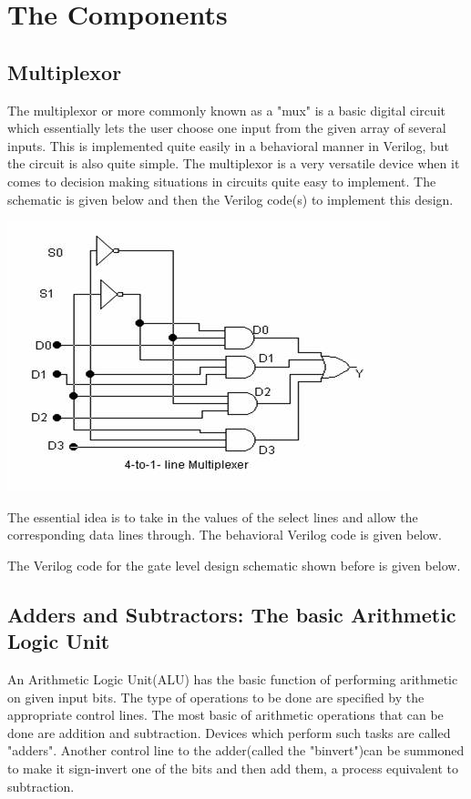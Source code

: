 \documentclass[11pt]{article}
\begin{document}
\section{The Components}
\subsection{Multiplexor}
The multiplexor or more commonly known as a "mux" is a basic digital circuit which essentially lets the user choose one input from the given array of several inputs. This is implemented quite easily in a behavioral manner in Verilog, but the circuit is also quite simple. The multiplexor is a very versatile device when it comes to decision making situations in circuits quite easy to implement. The schematic is given below and then the Verilog code(s) to implement this design.

\includegraphics[scale=1.15]{image010.jpg}

The essential idea is to take in the values of the select lines and allow the corresponding data lines through. The behavioral Verilog code is given below.

The Verilog code for the gate level design schematic shown before is given below.


\subsection{Adders and Subtractors: The basic Arithmetic Logic Unit}
An Arithmetic Logic Unit(ALU) has the basic function of performing arithmetic on given input bits. The type of operations to be done are specified by the appropriate control lines. The most basic of arithmetic operations that can be done are addition and subtraction. Devices which perform such tasks are called "adders". Another control line to the adder(called the "binvert")can be summoned to make it sign-invert one of the bits and then add them, a process equivalent to subtraction.
\end{document}
